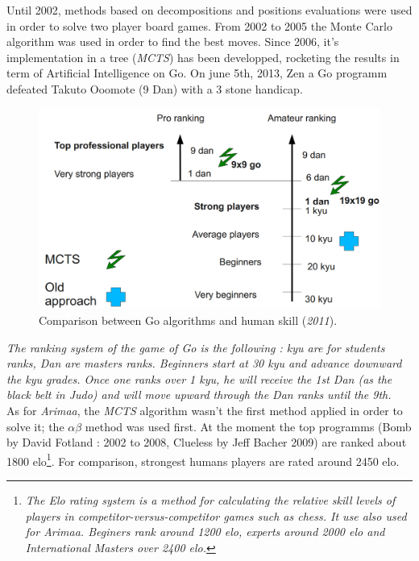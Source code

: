 \label{third part part}
Until 2002, methods based on decompositions and positions evaluations were used in order to solve two player board games. From 2002 to 2005 the Monte Carlo algorithm was used in order to find the best moves. Since 2006, it's implementation in a tree (\emph{MCTS}) has been developped, rocketing the results in term of Artificial Intelligence on Go. On june 5th, 2013, Zen a Go programm defeated Takuto Ooomote (9 Dan) with a 3 stone handicap.\cite{computer_Go_vs_human}
\begin{figure}[H]
\centering
\includegraphics[width=12cm]{2_State_of_the_art/Arimaa_on_MCTS_Benoit/img/ranking.png}
\caption{\label{fig:ranking}Comparison between Go algorithms and human skill (\textit{2011})\cite{graphic_MCTS_Go}.}
\end{figure}
\textit{The ranking system of the game of Go is the following : kyu are for students ranks, Dan are masters ranks. Beginners start at 30 kyu and advance downward the kyu grades. Once one ranks over 1 kyu, he will receive the 1st Dan (as the black belt in Judo) and will move upward through the Dan ranks until the 9th.}\bigskip
\\
As for \emph{Arimaa}, the \emph{MCTS} algorithm wasn't the first method applied in order to solve it; the \ensuremath{\alpha\beta} method was used first. At the moment the top programms (Bomb by David Fotland : 2002 to 2008, Clueless by Jeff Bacher 2009) are ranked about 1800 elo\footnote{\textit{The Elo rating system is a method for calculating the relative skill levels of players in competitor-versus-competitor games such as chess. It use also used for Arimaa. Beginers rank around 1200 elo, experts around 2000 elo and International Masters over 2400 elo.}}. For comparison, strongest humans players are rated around 2450 elo.\cite{master_mcts_kozeleck}
\medskip
